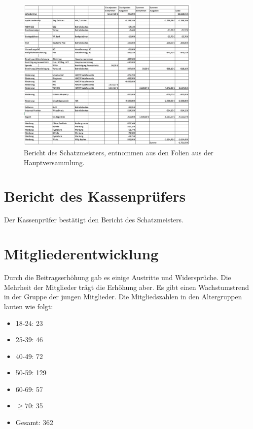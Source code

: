 \documentclass[a4paper, 11pt]{article}
\begin{document}
\begin{figure}
    \centering
    \includegraphics[width=0.8\textwidth]{kasse3.PNG}
    \caption{Bericht des Schatzmeisters, entnommen aus den Folien aus der Hauptversammlung.}
    \label{fig:kasse3}
\end{figure}


\section*{Bericht des Kassenprüfers}

Der Kassenprüfer bestätigt den Bericht des Schatzmeisters.

\section*{Mitgliederentwicklung}

Durch die Beitragserhöhung gab es einige Austritte und Widersprüche. Die Mehrheit der Mitglieder trägt die Erhöhung aber.
Es gibt einen Wachstumstrend in der Gruppe der jungen Mitglieder.
Die Mitgliedszahlen in den Altergruppen lauten wie folgt:

\begin{itemize}
    \item 18-24: 23
    \item 25-39: 46
    \item 40-49: 72
    \item 50-59: 129
    \item 60-69: 57
    \item $\geq 70$: 35
    \item Gesamt: 362
\end{itemize}
\end{document}
